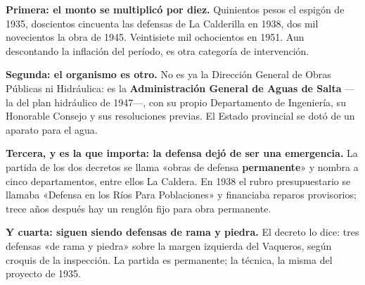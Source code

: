 \textbf{Primera: el monto se multiplicó por diez.} Quinientos pesos el espigón de 1935,
doscientos cincuenta las defensas de La Calderilla en 1938, dos mil novecientos la obra de
1945. Veintisiete mil ochocientos en 1951. Aun descontando la inflación del período, es otra
categoría de intervención.

\textbf{Segunda: el organismo es otro.} No es ya la Dirección General de
Obras Públicas ni Hidráulica: es la \textbf{Administración General de Aguas de Salta} ---la del plan hidráulico de 1947---, con su
propio Departamento de Ingeniería, su Honorable Consejo y sus resoluciones previas. El Estado
provincial se dotó de un aparato para el agua.

\textbf{Tercera, y es la que importa: la defensa dejó de ser una emergencia.} La partida de los dos decretos se
llama «obras de defensa \textbf{permanente}» y nombra a cinco departamentos, entre ellos La
Caldera. En 1938 el rubro presupuestario se llamaba «Defensa en los Ríos Para Poblaciones» y
financiaba reparos provisorios; trece años después hay un renglón fijo para obra permanente.

\textbf{Y cuarta: siguen siendo defensas de rama y piedra.} El decreto lo dice: tres defensas
«de rama y piedra» sobre la margen izquierda del Vaqueros, según croquis de la inspección. La
partida es permanente; la técnica, la misma del proyecto de 1935.

